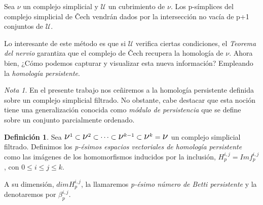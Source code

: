 \documentclass[12pt, a4paper, twoside]{book}
\numberwithin{equation}{section}
\theoremstyle{definition}
\newtheorem{defi}{Definición}
\theoremstyle{remark}
\newtheorem*{remark}{Nota}
\theoremstyle{plain}
\begin{document}
	Sea {\Large $\nu$} un complejo simplicial y $\mathcal{U}$ un 
	cubrimiento de {\Large $\nu$}. Los p-símplices del complejo simplicial
	de Čech vendrán dados por la intersección no vacía de p+1 conjuntos de
	$\mathcal{U}$.

	Lo interesante de este método es que si $\mathcal{U}$ verifica ciertas
	condiciones, el \emph{Teorema del nervio} garantiza que el complejo de
	Čech recupera la homología de {\Large $\nu$}. Ahora bien, ¿Cómo 
	podemos capturar y visualizar esta nueva información? Empleando la 
	\emph{homología persistente}.

	\begin{remark}
	En el presente trabajo nos ceñiremos a la homología persistente 
	definida sobre un complejo simplicial filtrado. No obstante, cabe 
	destacar que esta noción tiene una generalización conocida como 
	\emph{módulo de persistencia} que se define sobre un conjunto 
	parcialmente ordenado.
	\end{remark}

	\begin{defi}
	Sea $ \text{{\Large $\nu$}$^{1}$} 
		\subset \text{{\Large $\nu$}$^{2}$} \subset \cdots \subset
		\text{{\Large $\nu$}$^{k-1}$} \subset 
		\text{{\Large $\nu$}$^{k}$} = \text{{\Large $\nu$}}$ un 
		complejo simplicial filtrado. Definimos los \textit{p-ésimos
		espacios vectoriales de homología persistente} como las 
		imágenes de los homomorfismos inducidos por la inclusión, 
		$H_{p}^{i,j}=Imf_{p}^{i,j}$, con $0\leq i \leq j \leq k$.

		A su dimensión, $dimH_{p}^{i,j}$, la llamaremos \textit{p-ésimo 
		número de Betti persistente} y la denotaremos por 
		$\beta_{p}^{i,j}$.
	\end{defi}
\end{document}
